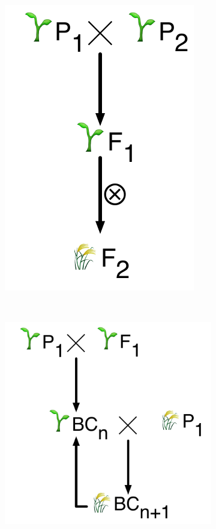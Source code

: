 \begin{figure}
\centering
\begin{subfigure}{0.45\textwidth}
\centering
\caption{}
\label{fig:lit:f2}
\includegraphics[height=0.20\textheight]{LitReview/Figures/crosses/F2.pdf}
\end{subfigure}
~
\begin{subfigure}{0.45\textwidth}
\centering
\caption{}
\label{fig:lit:bc}
\includegraphics[height=0.20\textheight]{LitReview/Figures/crosses/BC.pdf}
\end{subfigure}



\end{figure}
